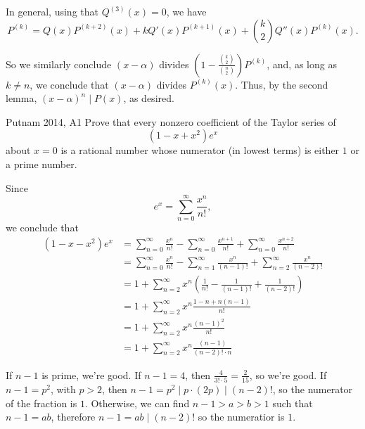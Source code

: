 \begin{sol}{}{}
	In general, using that \(Q^{(3)}(x) = 0\), we have \[
		P^{(k)} = Q(x)P^{(k+2)}(x) + kQ'(x)P^{(k+1)}(x) + \binom{k}{2}Q''(x)P^{(k)}(x).
	\]

	So we similarly conclude \((x-\alpha)\) divides \(\left(1 - \frac{\binom{k}{2}}{\binom{n}{2}}\right)P^{(k)}\), and, as long as \(k \neq n\), we conclude that \((x-\alpha)\) divides \(P^{(k)}(x)\). Thus, by the second lemma, \((x-\alpha)^n \mid P(x)\), as desired.
\end{sol}

\begin{prob}{Putnam 2014, A1}{}
	Prove that every nonzero coefficient of the Taylor series of \[
		(1 - x + x^2)e^x
	\] about $x=0$ is a rational number whose numerator (in lowest terms) is either $1$ or a prime number.
\end{prob}

\begin{sol}{}{}
	Since \[
		e^x = \sum_{n=0}^\infty \frac{x^n}{n!},
	\]
	we conclude that
	\begin{align*}
		(1 - x - x^2)e^x &= \sum_{n=0}^\infty \frac{x^n}{n!} - \sum_{n=0}^\infty \frac{x^{n+1}}{n!} +  \sum_{n=0}^\infty \frac{x^{n+2}}{n!} \\
		&= \sum_{n=0}^\infty \frac{x^n}{n!} - \sum_{n=1}^\infty \frac{x^{n}}{(n-1)!} +  \sum_{n=2}^\infty \frac{x^{n}}{(n-2)!} \\
		&= 1 + \sum_{n=2}^\infty x^n\left( \frac{1}{n!} - \frac{1}{(n-1)!} + \frac{1}{(n-2)!} \right) \\
		&= 1 + \sum_{n=2}^\infty x^n \frac{1 - n + n(n-1)}{n!} \\
		&= 1 + \sum_{n=2}^\infty x^n \frac{(n-1)^2}{n!}\\
		&= 1 + \sum_{n=2}^\infty x^n \frac{(n-1)}{(n-2)! \cdot n}
	\end{align*}

	If \(n - 1\) is prime, we're good. If \(n - 1 = 4\), then \(\frac{4}{3!\cdot5} = \frac{2}{15}\), so we're good. If \(n - 1 = p^2\), with \(p > 2\), then \(n-1 = p^2 \mid p \cdot (2p) \mid (n-2)!\), so the numerator of the fraction is \(1\). Otherwise, we can find \(n - 1 > a > b > 1\) such that  \(n - 1 = ab\), therefore  \(n-1 = ab \mid (n-2)!\) so the numeratior is \(1\).
\end{sol}
